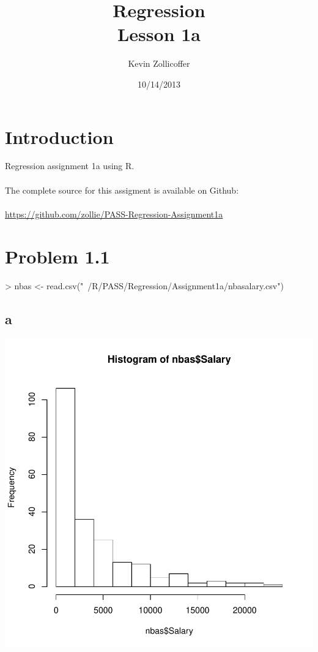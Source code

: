 \documentclass{article}
\author{Kevin Zollicoffer}
\title{Regression\\Lesson 1a}
\date{10/14/2013}
\begin{document}
\maketitle


\section*{Introduction}
Regression assignment 1a using R. 
\\
\\
The complete source for this assigment is available on Github:
\\
\\
\url{https://github.com/zollie/PASS-Regression-Assignment1a}

\section*{Problem 1.1}
\begin{Schunk}
\begin{Sinput}
>   nbas <- read.csv("~/R/PASS/Regression/Assignment1a/nbasalary.csv")
\end{Sinput}
\end{Schunk}

\subsection*{a}
\begin{Schunk}
\end{Schunk}
\includegraphics{Assignment1A-002}
\end{document}

